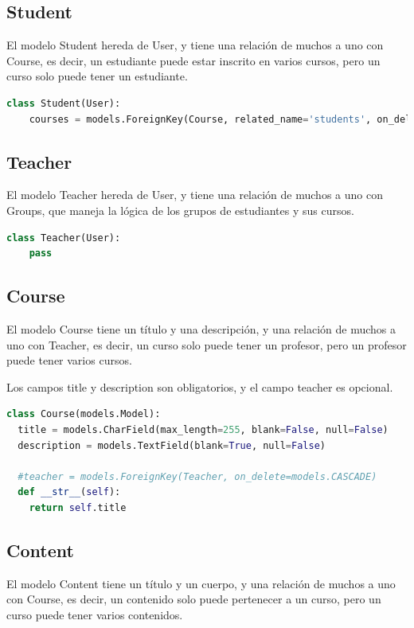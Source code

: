 \subsection{Student}

El modelo Student hereda de User, y tiene una relación de muchos a uno con Course, es decir, un estudiante puede estar inscrito en varios cursos, pero un curso solo puede tener un estudiante.

\begin{lstlisting}[language=Python]
class Student(User):
    courses = models.ForeignKey(Course, related_name='students', on_delete=models.CASCADE)
\end{lstlisting}

\subsection{Teacher}

El modelo Teacher hereda de User, y tiene una relación de muchos a uno con Groups, que maneja la lógica de los grupos de estudiantes y sus cursos. 

\begin{lstlisting}[language=Python]
class Teacher(User):
    pass
\end{lstlisting}

\subsection{Course}
El modelo Course tiene un título y una descripción, y una relación de muchos a uno con Teacher, es decir, un curso solo puede tener un profesor, pero un profesor puede tener varios cursos.

Los campos title y description son obligatorios, y el campo teacher es opcional.

\begin{lstlisting}[language=Python]
class Course(models.Model):
  title = models.CharField(max_length=255, blank=False, null=False)
  description = models.TextField(blank=True, null=False)

  #teacher = models.ForeignKey(Teacher, on_delete=models.CASCADE)
  def __str__(self):
    return self.title
\end{lstlisting}

\subsection{Content}

El modelo Content tiene un título y un cuerpo, y una relación de muchos a uno con Course, es decir, un contenido solo puede pertenecer a un curso, pero un curso puede tener varios contenidos.

